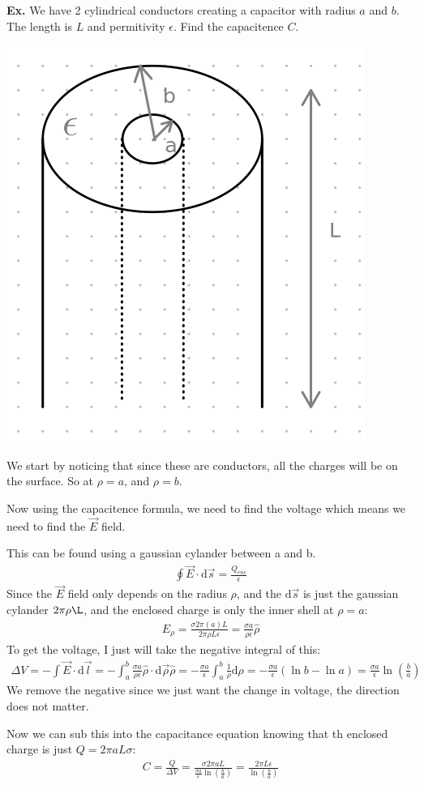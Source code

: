 \documentclass[12pt,letterpaper]{article} \usepackage{amsmath} \usepackage{graphicx} \usepackage[margin=1in]{geometry} \usepackage{longtable}  \usepackage{amssymb}
\begin{document}
	\begin{mdframed}
		\textbf{Ex. } We have 2 cylindrical conductors creating a capacitor with radius $a$ and $b$. The length is $L$ and permitivity $\epsilon$. Find the capacitence $C$. 
		\begin{center}
			\includegraphics[width=0.4\linewidth]{ex-cap}
		\end{center}
	
		We start by noticing that since these are conductors, all the charges will be on the surface. So at $\rho = a$, and $\rho = b$. 
		
		Now using the capacitence formula, we need to find the voltage which means we need to find the $\vec E$ field. 
		
		This can be found using a gaussian cylander between a and b. 
		\begin{align*}
			\oint \vec E \cdot \mathrm d \vec s = \frac{Q_{enc}}{\epsilon}
		\end{align*}
		Since the $\vec E$ field only depends on the radius $\rho$, and the $\mathrm d \vec s$ is just the gaussian cylander $2\pi \rho \L$, and the enclosed charge is only the inner shell at $\rho = a$:
		\begin{align*}
			E_\rho = \frac{\sigma 2\pi (a)L}{2\pi \rho L \epsilon} = \frac{\sigma a}{\rho \epsilon} \hat \rho
		\end{align*}
		To get the voltage, I just will take the negative integral of this:
		\begin{align*}
			\Delta V = -\int \vec E \cdot \mathrm d \vec l = -\int_a^b \frac{\sigma a}{\rho \epsilon}\hat\rho \cdot \mathrm d \vec \rho\hat\rho = -\frac{\sigma a}{\epsilon}\int^b_a \frac{1}{\rho} \mathrm d \rho = -\frac{\sigma a}{\epsilon} (\ln b - \ln a) = \frac{\sigma a}{\epsilon} \ln\left(\frac{b}{a}\right)
		\end{align*}
		We remove the negative since we just want the change in voltage, the direction does not matter. 
		
		Now we can sub this into the capacitance equation knowing that th enclosed charge is just $Q=2\pi a L\sigma$:
		\begin{align*}
			C = \frac{Q}{\Delta V} = \frac{\sigma2\pi a L}{\frac{\sigma a}{\epsilon} \ln\left(\frac{b}{a}\right)} = \frac{2\pi L\epsilon}{ \ln\left(\frac{b}{a}\right)}
		\end{align*}
		
	\end{mdframed}
	
\end{document}
